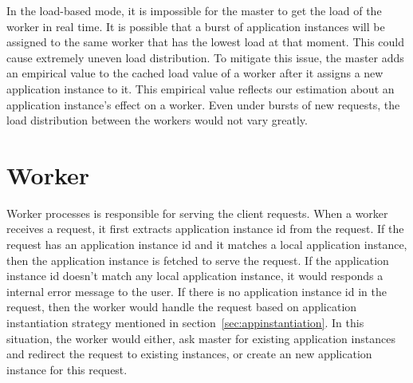 In the load-based mode, it is impossible for the master to get
the load of the worker in real time.
It is possible that a burst of application instances will 
be assigned to the same worker that has the lowest load at that moment.
This could cause extremely uneven load distribution.
To mitigate this issue, the master adds an empirical value to the cached
load value of a worker after it assigns a new application instance to it.
This empirical value reflects our estimation about an application instance's 
effect on a worker.
Even under bursts of new requests, 
the load distribution between the workers would not vary greatly.


\section{Worker}

Worker processes is responsible for serving the client requests.
When a worker receives a request,
it first extracts application instance id from the request.
If the request has an application instance id
and it matches a local application instance,
then the application instance is fetched to serve the request.
If the application instance id doesn't match any local application instance,
it would responds a internal error message to the user.
If there is no application instance id 
in the request,
then the worker would handle the request based on application instantiation strategy
mentioned in section~\ref{sec:appinstantiation}.
In this situation,
the worker would either, ask master for existing application instances and
redirect the request to existing instances,
or create an new application instance for this request.



